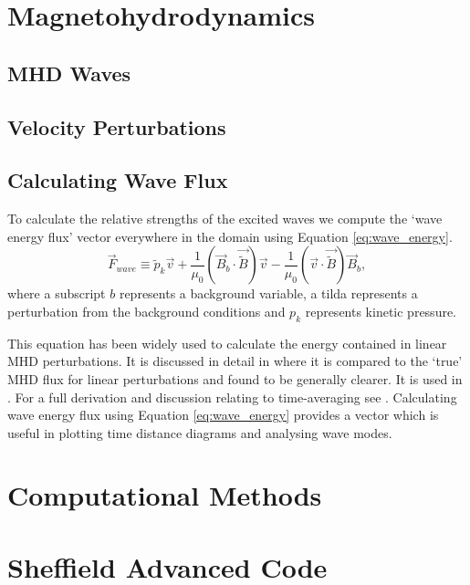 \section{Magnetohydrodynamics}\label{sec:MHD}

\subsection{MHD Waves}\label{sec:MHDwaves}

\subsection{Velocity Perturbations}\label{sec:Vpert}

\subsection{Calculating Wave Flux}\label{sec:waveflux}


To calculate the relative strengths of the excited waves we compute the `wave energy flux' vector everywhere in the domain using Equation \ref{eq:wave_energy}.
\begin{equation}
\vec{F}_{wave} \equiv \widetilde{p}_k \vec{v} + \frac{1}{\mu_0} \left(\vec{B}_b \cdot \vec{\widetilde{B}}\right) \vec{v} - \frac{1}{\mu_0}\left(\vec{v} \cdot \vec{\widetilde{B}} \right) \vec{B}_b,
\label{eq:wave_energy}
\end{equation}
where a subscript $b$ represents a background variable, a tilda represents a perturbation from the background conditions and $p_k$ represents kinetic pressure.

This equation has been widely used to calculate the energy contained in linear MHD perturbations.
It is discussed in detail in \cite{bogdan2003} where it is compared to the `true' MHD flux for linear perturbations and found to be generally clearer. 
It is used in \cite{vigeesh2009, vigeesh2012, khomenko2012}. 
For a full derivation and discussion relating to time-averaging see \cite{leroy1985}.
Calculating wave energy flux using Equation \ref{eq:wave_energy} provides a vector which is useful in plotting time distance diagrams and analysing wave modes.

\section{Computational Methods}\label{sec:numericalmethods}

\section{Sheffield Advanced Code}\label{sec:SAC}